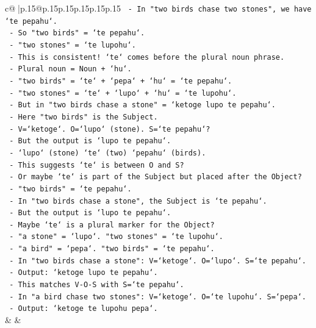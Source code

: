 \documentclass{article}
\begin{document}
{\begin{supertabular}{c@{$\;$}|p{.15\linewidth}@{}p{.15\linewidth}p{.15\linewidth}p{.15\linewidth}p{.15\linewidth}p{.15\linewidth}}
{{{\texttt{      {-} In "two birds chase two stones", we have `te pepahu`.} \\
\texttt{      {-} So "two birds" = `te pepahu`.} \\
\texttt{      {-} "two stones" = `te lupohu`.} \\
\texttt{      {-} This is consistent! `te` comes before the plural noun phrase.} \\
\texttt{      {-} Plural noun = Noun + `hu`.} \\
\texttt{      {-} "two birds" = `te` + `pepa` + `hu` = `te pepahu`.} \\
\texttt{      {-} "two stones" = `te` + `lupo` + `hu` = `te lupohu`.} \\
\texttt{      {-} But in "two birds chase a stone" = `ketoge lupo te pepahu`.} \\
\texttt{      {-} Here "two birds" is the Subject.} \\
\texttt{      {-} V=`ketoge`. O=`lupo` (stone). S=`te pepahu`?} \\
\texttt{      {-} But the output is `lupo te pepahu`.} \\
\texttt{      {-} `lupo` (stone) `te` (two) `pepahu` (birds).} \\
\texttt{      {-} This suggests `te` is between O and S?} \\
\texttt{      {-} Or maybe `te` is part of the Subject but placed after the Object?} \\
\texttt{      {-} "two birds" = `te pepahu`.} \\
\texttt{      {-} In "two birds chase a stone", the Subject is `te pepahu`.} \\
\texttt{      {-} But the output is `lupo te pepahu`.} \\
\texttt{      {-} Maybe `te` is a plural marker for the Object?} \\
\texttt{      {-} "a stone" = `lupo`. "two stones" = `te lupohu`.} \\
\texttt{      {-} "a bird" = `pepa`. "two birds" = `te pepahu`.} \\
\texttt{      {-} In "two birds chase a stone": V=`ketoge`. O=`lupo`. S=`te pepahu`.} \\
\texttt{      {-} Output: `ketoge lupo te pepahu`.} \\
\texttt{      {-} This matches V{-}O{-}S with S=`te pepahu`.} \\
\texttt{      {-} In "a bird chase two stones": V=`ketoge`. O=`te lupohu`. S=`pepa`.} \\
\texttt{      {-} Output: `ketoge te lupohu pepa`.} \\
            }
        }
    }
    & & \\ \\


\end{supertabular}}
\end{document}
